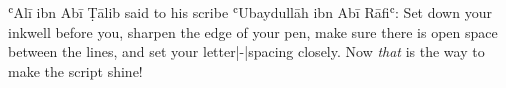 ʿAlī ibn Abī Ṭālib said to his scribe ʿUbaydullāh ibn Abī Rāfiʿ: Set
down your inkwell before you, sharpen the edge of your pen, make sure
there is open space between the lines, and set your letter|-|spacing
closely. Now {\em that} is the way to make the script shine!
